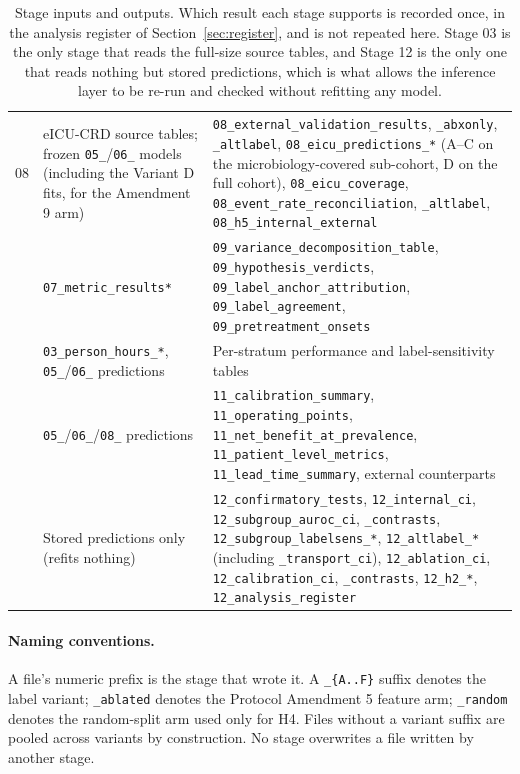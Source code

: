 \begin{table}[H]
\begin{tabularx}{\textwidth}{p{0.9cm}p{4.2cm}X}
        08 & eICU-CRD source tables; frozen \texttt{05\_}/\texttt{06\_} models
        (including the Variant D fits, for the Amendment 9 arm) &
        \texttt{08\_external\_validation\_results}, \texttt{\_abxonly},
        \texttt{\_altlabel}, \texttt{08\_eicu\_predictions\_*} (A--C on the
        microbiology-covered sub-cohort, D on the full cohort),
        \texttt{08\_eicu\_coverage},
        \texttt{08\_event\_rate\_reconciliation}, \texttt{\_altlabel},
        \texttt{08\_h5\_internal\_external} \\
        \addlinespace
        09 & \texttt{07\_metric\_results*} &
        \texttt{09\_variance\_decomposition\_table},
        \texttt{09\_hypothesis\_verdicts},
        \texttt{09\_label\_anchor\_attribution},
        \texttt{09\_label\_agreement}, \texttt{09\_pretreatment\_onsets} \\
        \addlinespace
        10 & \texttt{03\_person\_hours\_*}, \texttt{05\_}/\texttt{06\_}
        predictions &
        Per-stratum performance and label-sensitivity tables \\
        \addlinespace
        11 & \texttt{05\_}/\texttt{06\_}/\texttt{08\_} predictions &
        \texttt{11\_calibration\_summary}, \texttt{11\_operating\_points},
        \texttt{11\_net\_benefit\_at\_prevalence},
        \texttt{11\_patient\_level\_metrics},
        \texttt{11\_lead\_time\_summary}, external counterparts \\
        \addlinespace
        12 & Stored predictions only (refits nothing) &
        \texttt{12\_confirmatory\_tests}, \texttt{12\_internal\_ci},
        \texttt{12\_subgroup\_auroc\_ci}, \texttt{\_contrasts},
        \texttt{12\_subgroup\_labelsens\_*}, \texttt{12\_altlabel\_*}
        (including \texttt{\_transport\_ci}),
        \texttt{12\_ablation\_ci}, \texttt{12\_calibration\_ci},
        \texttt{\_contrasts},
        \texttt{12\_h2\_*}, \texttt{12\_analysis\_register} \\
        \bottomrule
    \end{tabularx}
    \caption{Stage inputs and outputs. Which result each stage supports is
    recorded once, in the analysis register of
    Section~\ref{sec:register}, and is not repeated here. Stage 03 is
    the only stage that reads the full-size source tables, and Stage 12 is the
    only one that reads nothing but stored predictions, which is what allows
    the inference layer to be re-run and checked without refitting any model.}
    \label{tab:stage_reference}
\end{table}

\paragraph{Naming conventions.} A file's numeric prefix is the stage that wrote
it. A \texttt{\_\{A..F\}} suffix denotes the label variant; \texttt{\_ablated}
denotes the Protocol Amendment 5 feature arm; \texttt{\_random} denotes the
random-split arm used only for H4. Files without a variant suffix are pooled
across variants by construction. No stage overwrites a file written by another
stage.
